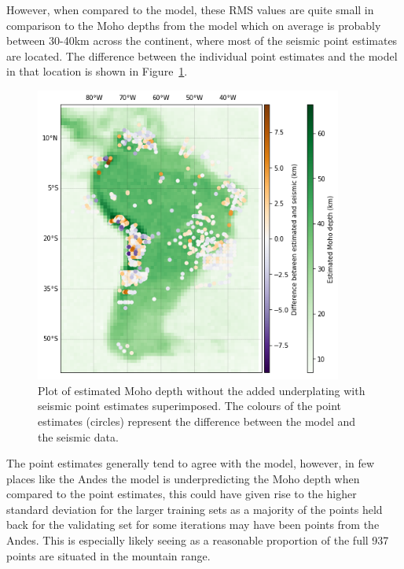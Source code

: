 However, when compared to the model, these RMS values are quite small in comparison to the Moho depths from the model which on average is probably between 30-40km across the continent, where most of the seismic point estimates are located. The difference between the individual point estimates and the model in that location is shown in Figure~\ref{fig:difference_no_intrusion}.
\begin{figure}[h]
  \begin{center}
    \includegraphics[width=0.9\textwidth]{figures/difference-no-intrusion}
  \end{center}
  \caption{
   Plot of estimated Moho depth without the added underplating with seismic point estimates superimposed. The colours of the point estimates (circles) represent the difference between the model and the seismic data.
  }
  \label{fig:difference_no_intrusion}
\end{figure}
The point estimates generally tend to agree with the model, however, in few places like the Andes the model is underpredicting the Moho depth when compared to the point estimates, this could have given rise to the higher standard deviation for the larger training sets as a majority of the points held back for the validating set for some iterations may have been points from the Andes. This is especially likely seeing as a reasonable proportion of the full 937 points are situated in the mountain range.
